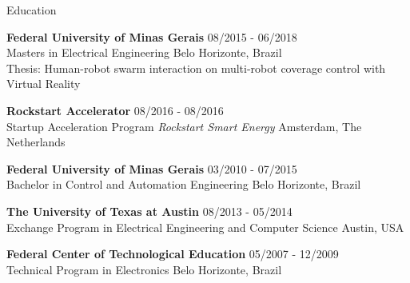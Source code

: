 \documentclass[14pt, a4paper]{resume} %
\begin{document}



\begin{rSection}{Education}

{\bf Federal University of Minas Gerais}  \hfill{08/2015 - 06/2018} \\ 
Masters in Electrical Engineering \hfill{Belo Horizonte, Brazil} \\
Thesis: Human-robot swarm interaction on multi-robot coverage control with Virtual Reality 

{\bf Rockstart Accelerator}  \hfill{08/2016 - 08/2016} \\ 
Startup Acceleration Program \textit{Rockstart Smart Energy} \hfill{Amsterdam, The Netherlands}

{\bf Federal University of Minas Gerais}  \hfill{03/2010 - 07/2015} \\ 
Bachelor in Control and Automation Engineering \hfill{Belo Horizonte, Brazil}

{\bf The University of Texas at Austin} \hfill {08/2013 - 05/2014} \\ 
Exchange Program in Electrical Engineering and Computer Science \hfill {Austin, USA}

{\bf Federal Center of Technological Education} \hfill {05/2007 - 12/2009} \\ 
Technical Program in Electronics \hfill{Belo Horizonte, Brazil}

\end{rSection}

\end{document}
